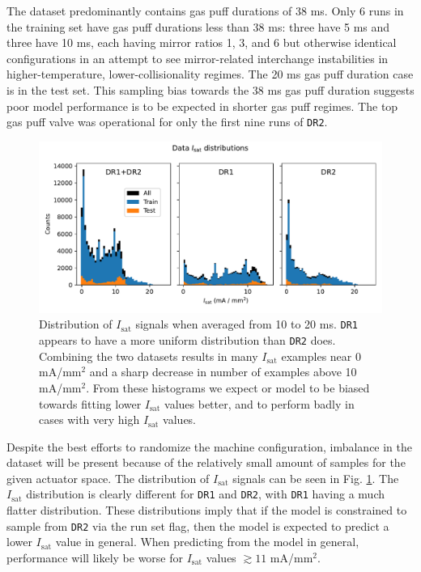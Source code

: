 The dataset predominantly contains gas puff durations of 38 ms. Only 6 runs in the training set have gas puff durations less than 38 ms: three have 5 ms and three have 10 ms, each having mirror ratios 1, 3, and 6 but otherwise identical configurations in an attempt to see mirror-related interchange instabilities in higher-temperature, lower-collisionality regimes. The 20 ms gas puff duration case is in the test set. This sampling bias towards the 38 ms gas puff duration suggests poor model performance is to be expected in shorter gas puff regimes. The top gas puff valve was operational for only the first nine runs of \texttt{DR2}.

\begin{figure}
	\centering
	\includegraphics[width=\linewidth]{figures/PP1_02_isat_distribution.pdf}
	\caption[Time-averaged $I_\text{sat}$ distribution over shots]{\label{fig:PP1_02_isat_distribution}Distribution of $I_\text{sat}$ signals when averaged from 10 to 20 ms. \texttt{DR1} appears to have a more uniform distribution than \texttt{DR2} does. Combining the two datasets results in many $I_\text{sat}$ examples near 0 mA/mm$^2$ and a sharp decrease in number of examples above 10 mA/mm$^2$. From these histograms we expect or model to be biased towards fitting lower $I_\text{sat}$ values better, and to perform badly in cases with very high $I_\text{sat}$ values.}
\end{figure}

Despite the best efforts to randomize the machine configuration, imbalance in the dataset will be present because of the relatively small amount of samples for the given actuator space. The distribution of $I_\text{sat}$ signals can be seen in Fig. \ref{fig:PP1_02_isat_distribution}. The $I_\text{sat}$ distribution is clearly different for \texttt{DR1} and \texttt{DR2}, with \texttt{DR1} having a much flatter distribution. These distributions imply that if the model is constrained to sample from \texttt{DR2} via the run set flag, then the model is expected to predict a lower $I_\text{sat}$ value in general. When predicting from the model in general, performance will likely be worse for $I_\text{sat}$ values $\gtrsim 11$ mA/mm$^2$. 

